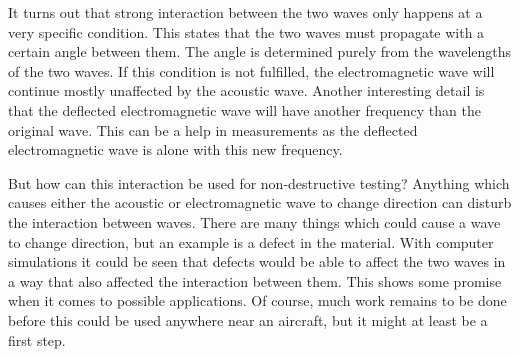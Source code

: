\documentclass[11pt]{article}
\begin{document}
\begin{multicols}{2}
		It turns out that strong interaction between the two waves only happens at a very specific condition. This states that the two waves must propagate with a certain angle between them. The angle is determined purely from the wavelengths of the two waves. If this condition is not fulfilled, the electromagnetic wave will continue mostly unaffected by the acoustic wave. Another interesting detail is that the deflected electromagnetic wave will have another frequency than the original wave. This can be a help in measurements as the deflected electromagnetic wave is alone with this new frequency.
		
		But how can this interaction be used for non-destructive testing? Anything which causes either the acoustic or electromagnetic wave to change direction can disturb the interaction between waves. There are many things which could cause a wave to change direction, but an example is a defect in the material. With computer simulations it could be seen that defects would be able to affect the two waves in a way that also affected the interaction between them. This shows some promise when it comes to possible applications. Of course, much work remains to be done before this could be used anywhere near an aircraft, but it might at least be a first step.
		
	\end{multicols}
	
\end{document}
